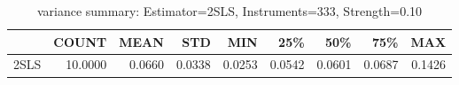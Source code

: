 \begin{table}[ht]
\centering
\caption{variance summary: Estimator=2SLS, Instruments=333, Strength=0.10}
\begin{tabular}{lrrrrrrrr}
\toprule
 & COUNT & MEAN & STD & MIN & 25\% & 50\% & 75\% & MAX \\
\midrule
2SLS & 10.0000 & 0.0660 & 0.0338 & 0.0253 & 0.0542 & 0.0601 & 0.0687 & 0.1426 \\
\bottomrule
\end{tabular}
\end{table}
